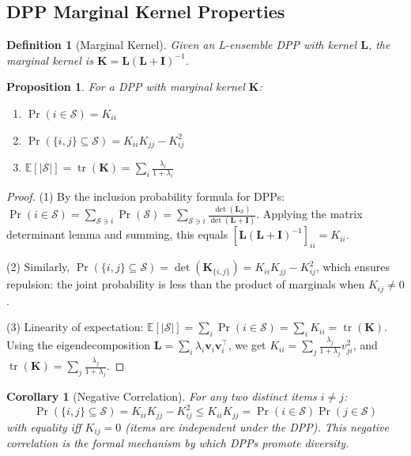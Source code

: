 \documentclass[11pt]{article}
\newtheorem{proposition}[theorem]{Proposition}
\newtheorem{corollary}[theorem]{Corollary}
\newtheorem{definition}[theorem]{Definition}
\DeclareMathOperator{\tr}{tr}
\begin{document}
\subsection{DPP Marginal Kernel Properties}

\begin{definition}[Marginal Kernel]
Given an L-ensemble DPP with kernel $\mathbf{L}$, the \emph{marginal kernel}
is $\mathbf{K} = \mathbf{L}(\mathbf{L} + \mathbf{I})^{-1}$.
\end{definition}

\begin{proposition}
\label{prop:marginal}
For a DPP with marginal kernel $\mathbf{K}$:
\begin{enumerate}[leftmargin=*]
\item $\Pr(i \in \mathcal{S}) = K_{ii}$
\item $\Pr(\{i, j\} \subseteq \mathcal{S}) = K_{ii} K_{jj} - K_{ij}^2$
\item $\mathbb{E}[|\mathcal{S}|] = \tr(\mathbf{K}) = \sum_i \frac{\lambda_i}{1 + \lambda_i}$
\end{enumerate}
\end{proposition}

\begin{proof}
(1) By the inclusion probability formula for DPPs:
$\Pr(i \in \mathcal{S}) = \sum_{\mathcal{S} \ni i} \Pr(\mathcal{S})
= \sum_{\mathcal{S} \ni i} \frac{\det(\mathbf{L}_{\mathcal{S}})}{\det(\mathbf{L} + \mathbf{I})}$.
Applying the matrix determinant lemma and summing, this equals
$[\mathbf{L}(\mathbf{L} + \mathbf{I})^{-1}]_{ii} = K_{ii}$.

(2) Similarly, $\Pr(\{i,j\} \subseteq \mathcal{S}) = \det(\mathbf{K}_{\{i,j\}})
= K_{ii} K_{jj} - K_{ij}^2$, which ensures repulsion: the joint probability
is less than the product of marginals when $K_{ij} \neq 0$.

(3) Linearity of expectation: $\mathbb{E}[|\mathcal{S}|] = \sum_i \Pr(i \in \mathcal{S}) = \sum_i K_{ii} = \tr(\mathbf{K})$.
Using the eigendecomposition $\mathbf{L} = \sum_i \lambda_i \mathbf{v}_i \mathbf{v}_i^\top$,
we get $K_{ii} = \sum_j \frac{\lambda_j}{1 + \lambda_j} v_{ji}^2$, and
$\tr(\mathbf{K}) = \sum_j \frac{\lambda_j}{1 + \lambda_j}$.
\end{proof}

\begin{corollary}[Negative Correlation]
For any two distinct items $i \neq j$:
\begin{equation}
\Pr(\{i,j\} \subseteq \mathcal{S}) = K_{ii}K_{jj} - K_{ij}^2 \leq K_{ii} K_{jj} = \Pr(i \in \mathcal{S}) \Pr(j \in \mathcal{S})
\end{equation}
with equality iff $K_{ij} = 0$ (items are independent under the DPP).
This negative correlation is the formal mechanism by which DPPs promote
diversity.
\end{corollary}
\end{document}

